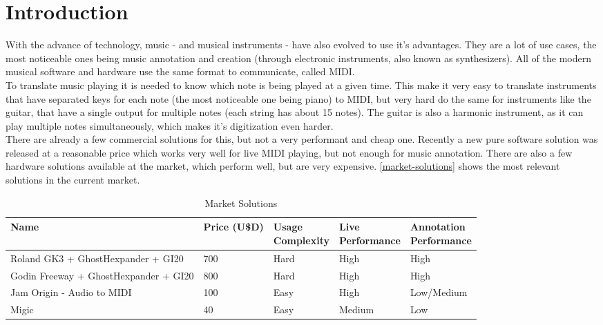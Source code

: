 \chapter[Introduction]{Introduction}

With the advance of technology, music - and musical instruments - have also evolved to
use it's advantages. They are a lot of use cases, the most noticeable ones being music
annotation and creation (through electronic instruments, also known as synthesizers).
All of the modern musical software and hardware use the same format to communicate,
called MIDI. \\
To translate music playing it is needed to know which note is being played at a
given time. This make it very easy to translate instruments that have separated
keys for each note (the most noticeable one being piano) to MIDI, but very hard
do the same for instruments like the guitar, that have a single output for multiple
notes (each string has about 15 notes). The guitar is also a harmonic instrument,
as it can play multiple notes simultaneously, which makes it's digitization even harder.\\
There are already a few commercial solutions for this, but not a very performant
and cheap one. Recently a new pure software solution was released at a reasonable
price which works very well for live MIDI playing, but not enough for music annotation.
There are also a few hardware solutions available at the market, which perform well,
but are very expensive. \autoref{market-solutions} shows the most relevant solutions
in the current market.

\begin{table}[htb]
  \begin{center}
    \ABNTEXreducedfont
    \caption[Market Solutions]{Market Solutions}
    \label{market-solutions}
    \begin{tabular}{m{4cm} | m{1cm} | m{2cm} | m{2cm} | m{2cm} }
      \hline
      Name & Price (U\$D) & \pbox{2cm}{Usage\\Complexity} & \pbox{2cm}{Live\\Performance} & \pbox{2cm}{Annotation\\Performance}\\
      \hline \hline
      Roland GK3 + GhostHexpander + GI20 & 700 & Hard & High & High \\
      Godin Freeway + GhostHexpander + GI20 & 800 & Hard & High & High \\
      Jam Origin - Audio to MIDI & 100 & Easy & High & Low/Medium \\
      Migic & 40 & Easy & Medium & Low \\
      \hline
    \end{tabular}
  \end{center}
\end{table}

